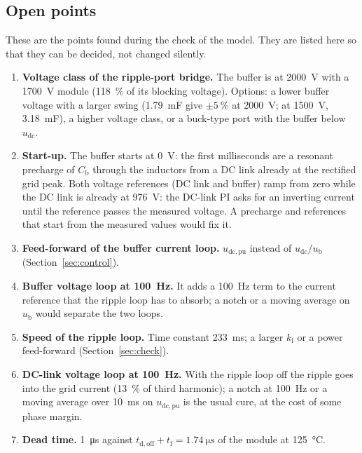 \documentclass[11pt,a4paper]{scrartcl}
\newcommand{\ped}[1]{_{\mathrm{#1}}}
\begin{document}
\begin{onehalfspace}
\section{Open points}
\label{sec:open}

These are the points found during the check of the model. They are listed here so that they can be decided, not changed silently.

\begin{enumerate}[nosep]
	\item \textbf{Voltage class of the ripple-port bridge.} The buffer is at \SI{2000}{\volt} with a \SI{1700}{\volt} module (\SI{118}{\percent} of its blocking voltage). Options: a lower buffer voltage with a larger swing (\SI{1.79}{\milli\farad} give $\pm\SI{5}{\percent}$ at \SI{2000}{\volt}; at \SI{1500}{\volt}, \SI{3.18}{\milli\farad}), a higher voltage class, or a buck-type port with the buffer below $u\ped{dc}$.
	\item \textbf{Start-up.} The buffer starts at \SI{0}{\volt}: the first milliseconds are a resonant precharge of $C\ped{b}$ through the inductors from a DC link already at the rectified grid peak. Both voltage references (DC link and buffer) ramp from zero while the DC link is already at \SI{976}{\volt}: the DC-link PI asks for an inverting current until the reference passes the measured voltage. A precharge and references that start from the measured values would fix it.
	\item \textbf{Feed-forward of the buffer current loop.} $u\ped{dc,pu}$ instead of $u\ped{dc}/u\ped{b}$ (Section~\ref{sec:control}).
	\item \textbf{Buffer voltage loop at \SI{100}{\hertz}.} It adds a \SI{100}{\hertz} term to the current reference that the ripple loop has to absorb; a notch or a moving average on $u\ped{b}$ would separate the two loops.
	\item \textbf{Speed of the ripple loop.} Time constant \SI{233}{\milli\second}; a larger $k\ped{i}$ or a power feed-forward (Section~\ref{sec:check}).
	\item \textbf{DC-link voltage loop at \SI{100}{\hertz}.} With the ripple loop off the ripple goes into the grid current (\SI{13}{\percent} of third harmonic); a notch at \SI{100}{\hertz} or a moving average over \SI{10}{\milli\second} on $u\ped{dc,pu}$ is the usual cure, at the cost of some phase margin.
	\item \textbf{Dead time.} \SI{1}{\micro\second} against $t\ped{d,off} + t\ped{f} = \SI{1.74}{\micro\second}$ of the module at \SI{125}{\celsius}.

\end{enumerate}
\end{onehalfspace}
\end{document}
